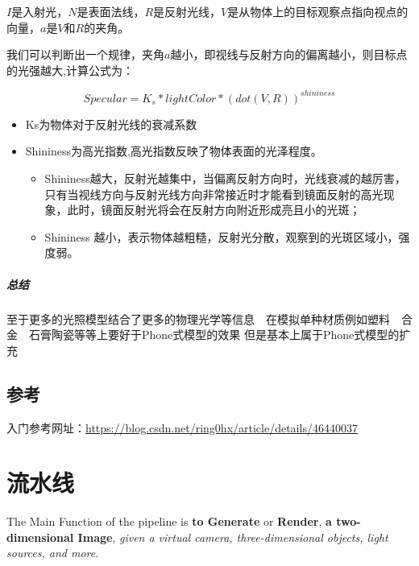 \documentclass[UTF8,a4paper,12pt]{ctexbook}
\begin{document}
				$I$是入射光，$N$是表面法线，$R$是反射光线，$V$是从物体上的目标观察点指向视点的向量，$a$是$V$和$R$的夹角。
				
				我们可以判断出一个规律，夹角$a$越小，即视线与反射方向的偏离越小，则目标点的光强越大,计算公式为：
					
					$$Specular = K_s * lightColor * (dot(V,R))^{shininess}$$ 
				
					\begin{itemize}
						\item Ks为物体对于反射光线的衰减系数
						\item Shininess为高光指数,高光指数反映了物体表面的光泽程度。
						\begin{itemize}
							\item Shininess越大，反射光越集中，当偏离反射方向时，光线衰减的越厉害，只有当视线方向与反射光线方向非常接近时才能看到镜面反射的高光现象，此时，镜面反射光将会在反射方向附近形成亮且小的光斑；
							\item Shininess 越小，表示物体越粗糙，反射光分散，观察到的光斑区域小，强度弱。
						\end{itemize}
					\end{itemize}
			
			\paragraph{总结}
				至于更多的光照模型结合了更多的物理光学等信息　在模拟单种材质例如塑料　合金　石膏陶瓷等等上要好于Phone式模型的效果 但是基本上属于Phone式模型的扩充
					
	\section{参考}
			入门参考网址：\url{https://blog.csdn.net/ring0hx/article/details/46440037}	
			
\chapter{流水线}
	The Main Function of the pipeline is \textbf{to Generate} or \textbf{Render}, \textbf{a two-dimensional Image}, \textit{given a virtual camera, three-dimensional objects, light sources, and more}.
	
	
\end{document}
